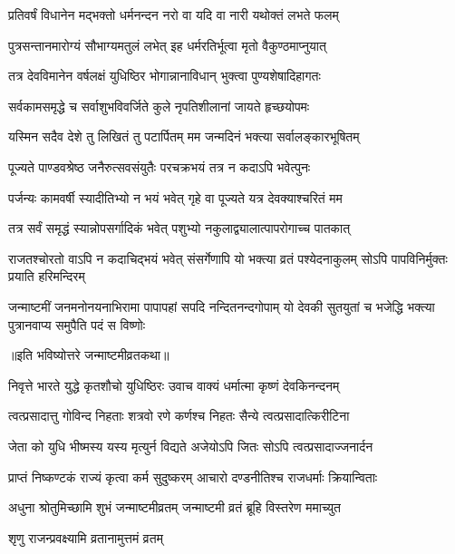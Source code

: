 \twolineshloka
{प्रतिवर्षं विधानेन मद्भक्तो धर्मनन्दन}
{नरो वा यदि वा नारी यथोक्तं लभते फलम्}%


\twolineshloka
{पुत्रसन्तानमारोग्यं सौभाग्यमतुलं लभेत्}
{इह धर्मरतिर्भूत्वा मृतो वैकुण्ठमाप्नुयात्}%


\twolineshloka
{तत्र देवविमानेन वर्षलक्षं युधिष्ठिर}
{भोगान्नानाविधान् भुक्त्वा पुण्यशेषादिहागतः}%


\twolineshloka
{सर्वकामसमृद्धे च सर्वाशुभविवर्जिते}
{कुले नृपतिशीलानां जायते हृच्छयोपमः}%


\twolineshloka
{यस्मिन सदैव देशे तु लिखितं तु पटार्पितम्}
{मम जन्मदिनं भक्त्या सर्वालङ्कारभूषितम्}%


\twolineshloka
{पूज्यते पाण्डवश्रेष्ठ जनैरुत्सवसंयुतैः}
{परचक्रभयं तत्र न कदाऽपि भवेत्पुनः}%


\twolineshloka
{पर्जन्यः कामवर्षी स्यादीतिभ्यो न भयं भवेत्}
{गृहे वा पूज्यते यत्र देवक्याश्चरितं मम}%


\twolineshloka
{तत्र सर्वं समृद्धं स्यान्नोपसर्गादिकं भवेत्}
{पशुभ्यो नकुलाद्व्यालात्पापरोगाच्च पातकात्}%

\threelineshloka
{राजतश्चोरतो वाऽपि न कदाचिद्भयं भवेत्}
{संसर्गेणापि यो भक्त्या व्रतं पश्येदनाकुलम्}
{सोऽपि पापविनिर्मुक्तः प्रयाति हरिमन्दिरम्}%

\fourlineindentedshloka
{जन्माष्टमीं जनमनोनयनाभिरामा}
{पापापहां सपदि नन्दितनन्दगोपाम्}
{यो देवकी सुतयुतां च भजेद्धि भक्त्या}
{पुत्रानवाप्य समुपैति पदं स विष्णोः}%

\centerline{॥इति भविष्योत्तरे जन्माष्टमीव्रतकथा॥}




\twolineshloka
{निवृत्ते भारते युद्धे कृतशौचो युधिष्ठिरः}
{उवाच वाक्यं धर्मात्मा कृष्णं देवकिनन्दनम्}%

\twolineshloka
{त्वत्प्रसादात्तु गोविन्द निहताः शत्रवो रणे}
{कर्णश्च निहतः सैन्ये त्वत्प्रसादात्किरीटिना}%

\twolineshloka
{जेता को युधि भीष्मस्य यस्य मृत्युर्न विद्यते}
{अजेयोऽपि जितः सोऽपि त्वत्प्रसादाज्जनार्दन}%

\twolineshloka
{प्राप्तं निष्कण्टकं राज्यं कृत्वा कर्म सुदुष्करम्}
{आचारो दण्डनीतिश्च राजधर्माः क्रियान्विताः}%

\twolineshloka
{अधुना श्रोतुमिच्छामि शुभं जन्माष्टमीव्रतम्}
{जन्माष्टमी व्रतं ब्रूहि विस्तरेण ममाच्युत}%

\onelineshloka
{शृणु राजन्प्रवक्ष्यामि व्रतानामुत्तमं व्रतम्}%

